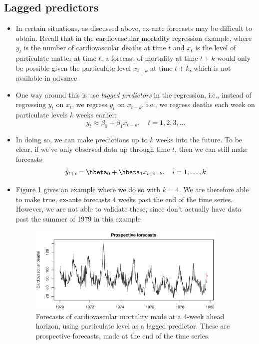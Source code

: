 \documentclass{article}
\begin{document}
\subsection{Lagged predictors}

\begin{itemize}
\item In certain situations, as discussed above, ex-ante forecasts may be
  difficult to obtain. Recall that in the cardiovascular mortality regression 
  example, where $y_t$ is the number of cardiovascular deaths at time $t$ and
  $x_t$ is the level of particulate matter at time $t$, a forecast of mortality
   at time $t+k$ would only be possible given the
  particulate level $x_{t+k}$ at time $t+k$, which is not available in advance  

\item One way around this is use \emph{lagged predictors} in the regression,
  i.e., instead of regressing $y_t$ on $x_t$, we regress $y_t$ on $x_{t-k}$,
  i.e., we regress deaths each week on particulate levels $k$ weeks earlier:
  \[
  y_t \approx \beta_0 + \beta_1 x_{t-k}, \quad t = 1,2,3,\dots
  \]

\item In doing so, we can make predictions up to $k$ weeks into the future. To
  be clear, if we've only observed data up through time $t$, then we can still
  make forecasts
  \[
  \hat{y}_{t+i} = \hbeta_0 + \hbeta_1 x_{t+i-k}, \quad i = 1,\dots,k
  \]

\item Figure \ref{fig:cardio_lagged} gives an example where we do so with $k =
  4$. We are therefore able to make true, ex-ante forecasts 4 weeks past the end
  of the time series. However, we are not able to validate these, since don't
  actually have data past the summer of 1979 in this example 

\begin{figure}[htb]
\centering
\includegraphics[width=0.9\textwidth]{fig/cardio-lagged-1.pdf} 
\caption{Forecasts of cardiovascular mortality made at a 4-week ahead horizon,
  using particulate level as a lagged predictor. These are prospective
  forecasts, made at the end of the time series.}
\label{fig:cardio_lagged}


\end{figure}
\end{itemize}
\end{document}

